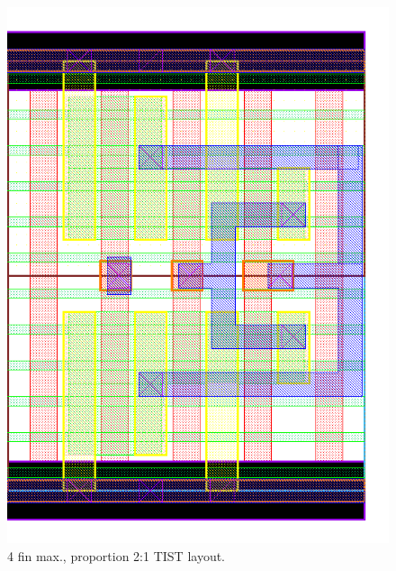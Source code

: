 \documentclass[pgmicro,mestrado,english]{iiufrgs}
\begin{document}
\begin{figure}[]
\centering
\includegraphics[width=\textwidth,height=\textheight,keepaspectratio]{TIST4F2F.png}
\caption{4 fin max., proportion 2:1 TIST layout.}
\label{fig:TIST3F}
\end{figure}
\end{document}
